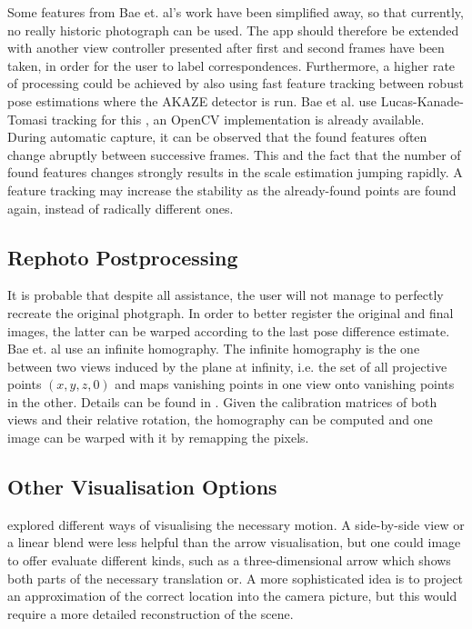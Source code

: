 Some features from Bae et. al's work have been simplified away, so that
currently, no really historic photograph can be used. The app should therefore
be extended with another view controller presented after first and second frames
have been taken, in order for the user to label correspondences. Furthermore, a
higher rate of processing could be achieved by also using fast feature tracking
between robust pose estimations where the AKAZE detector is run. Bae et al. use
Lucas-Kanade-Tomasi tracking for this \citep{lucas1981,tomasi1991}, an OpenCV
implementation is already available. During automatic capture, it can be
observed that the found features often change abruptly between successive
frames. This and the fact that the number of found features changes strongly
results in the scale estimation jumping rapidly. A feature tracking may increase
the stability as the already-found points are found again, instead of radically
different ones.

\subsection{Rephoto Postprocessing}

It is probable that despite all assistance, the user will not manage to
perfectly recreate the original photgraph.  In order to better register the
original and final images, the latter can be warped according to the last pose
difference estimate. Bae et. al use an infinite homography. The infinite
homography is the one between two views induced by the plane at infinity, i.e.
the set of all projective points $(x,y,z,0)$ and maps vanishing points in one
view onto vanishing points in the other. Details can be found in \citep[ch. 13.4]{h&z2004}.
Given the calibration matrices of both views and their relative
rotation, the homography can be computed and one image can be warped with it
by remapping the pixels.

\subsection{Other Visualisation Options}\label{subsec:alternative_visualisation}

\citet{bae2010} explored different ways of visualising the necessary motion.
A side-by-side view or a linear blend were less helpful than the arrow
visualisation, but one could image to offer evaluate different kinds, such as
a three-dimensional arrow which shows both parts of the necessary translation
or. A more sophisticated idea is to project an approximation of the correct
location into the camera picture, but this would require a more detailed
reconstruction of the scene.
